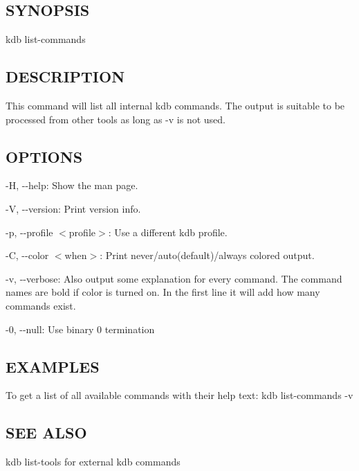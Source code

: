 \subsection*{S\+Y\+N\+O\+P\+S\+IS}

{\ttfamily kdb list-\/commands}

\subsection*{D\+E\+S\+C\+R\+I\+P\+T\+I\+ON}

This command will list all internal kdb commands. The output is suitable to be processed from other tools as long as {\ttfamily -\/v} is not used.

\subsection*{O\+P\+T\+I\+O\+NS}


\begin{DoxyItemize}
\item {\ttfamily -\/H}, {\ttfamily -\/-\/help}\+: Show the man page.
\item {\ttfamily -\/V}, {\ttfamily -\/-\/version}\+: Print version info.
\item {\ttfamily -\/p}, {\ttfamily -\/-\/profile $<$profile$>$}\+: Use a different kdb profile.
\item {\ttfamily -\/C}, {\ttfamily -\/-\/color $<$when$>$}\+: Print never/auto(default)/always colored output.
\item {\ttfamily -\/v}, {\ttfamily -\/-\/verbose}\+: Also output some explanation for every command. The command names are bold if color is turned on. In the first line it will add how many commands exist.
\item {\ttfamily -\/0}, {\ttfamily -\/-\/null}\+: Use binary 0 termination
\end{DoxyItemize}

\subsection*{E\+X\+A\+M\+P\+L\+ES}

To get a list of all available commands with their help text\+: {\ttfamily kdb list-\/commands -\/v}

\subsection*{S\+EE A\+L\+SO}


\begin{DoxyItemize}
\item {\ttfamily kdb list-\/tools} for external kdb commands 
\end{DoxyItemize}